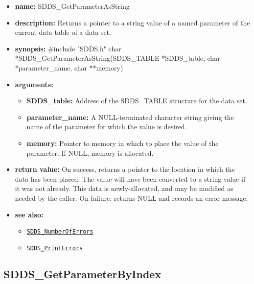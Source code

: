 \documentclass[11pt]{article}
\newcommand{\progref}[1]{\hyperref[SDDS_#1]{\tt SDDS\_#1}}
\begin{document}
\begin{itemize}
\item {\bf name:}\newline
SDDS\_GetParameterAsString
\item {\bf description:}\newline
Returns a pointer to a string value of a named parameter of the current data table of a data set.
\item {\bf synopsis:} \#include "SDDS.h"\newline
char *SDDS\_GetParameterAsString(SDDS\_TABLE *SDDS\_table, char *parameter\_name, char **memory)
\item {\bf arguments:}
\begin{itemize}
\item {\bf SDDS\_table:} Address of the SDDS\_TABLE structure for the data set.
\item {\bf parameter\_name:} A NULL-terminated character string giving the name of the parameter for which the value is desired.
\item {\bf memory:} Pointer to memory in which to place the value of the parameter. If NULL, memory is allocated.
\end{itemize}
\item {\bf return value:}\newline
On success, returns a pointer to the location in which the data has been placed. The value will have been converted to a string value if it was not already. This data is newly-allocated, and may be modified as needed by the caller. On failure, returns NULL and records an error message.
\item {\bf see also:}
\begin{itemize}
\item \progref{NumberOfErrors}
\item \progref{PrintErrors}
\end{itemize}
\end{itemize}

\subsection{SDDS\_GetParameterByIndex}
\label{SDDS_GetParameterByIndex}
\end{document}
